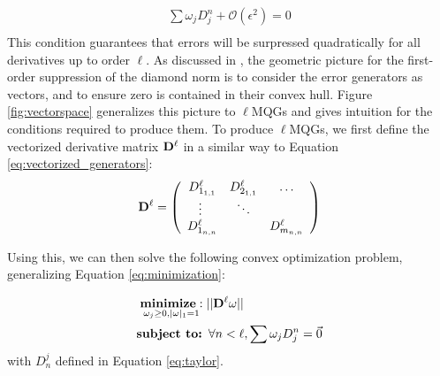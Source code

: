\documentclass[aps,nofootinbib,pra,notitlepage,twocolumn]{revtex4-1}
\begin{document}
\begin{equation}\label{eq:MQG-relaxed}
\begin{gathered}
\sum\omega_jD^n_j + \mathcal{O}(\epsilon^2) = 0\\
\end{gathered}
\end{equation}
This condition guarantees that errors will be surpressed quadratically for all derivatives up to order $\ell$. %
As discussed in \cite{Campbell2017}, the geometric picture for the first-order suppression of the diamond norm is to consider the error generators as vectors, and to ensure zero is contained in their convex hull. Figure \ref{fig:vectorspace} generalizes this picture to $\ell$MQGs and gives intuition for the conditions required to produce them. To produce $\ell$MQGs, we first define the vectorized derivative matrix ${\bold{D}^{\ell}}$ in a similar way to Equation \ref{eq:vectorized_generators}:
\begin{equation}
{\bold{D}^{\ell}} =  \left(\begin{array}{cccc}
		D^\ell_{1_{1,1}} & D^\ell_{2_{1,1}} & \ldots   \\ 
		\vdots\ & \ddots &    \\
		D^\ell_{1_{n,n}} &  &  D^\ell_{m_{n,n}} \\ 
	\end{array} 	
	\right)
\end{equation}

Using this, we can then solve the following convex optimization problem, generalizing Equation \ref{eq:minimization}:

\begin{equation}\label{eq:robust_minimization}
  \begin{split}
    &\underset{\omega_j\geq0, |\omega|_1=1}{\textbf{minimize}: } ||{\bold{D}^{\ell}}\omega||\\
    &\textbf{subject to: } \forall n<\ell, \sum \omega_jD_j^n=\vec{0}\\
  \end{split}
\end{equation}
with $D_n^j$ defined in Equation \ref{eq:taylor}. 
\end{document}
